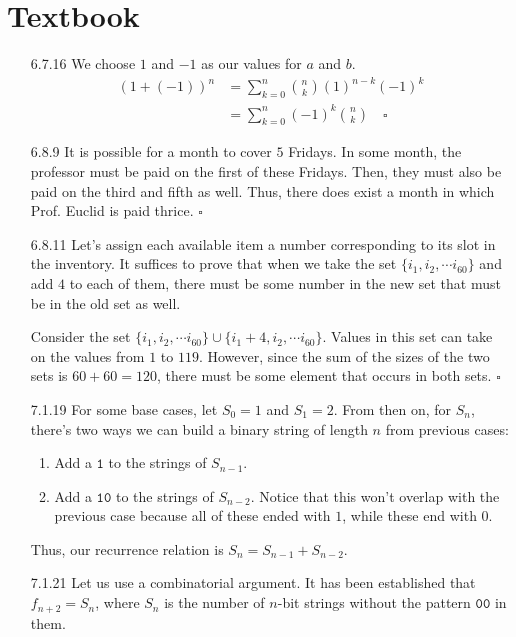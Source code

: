 \documentclass[12pt]{article}
\begin{document}
\section{Textbook}\label{sec:textbook}

\begin{enumerate}
    \item[6.7.16] We choose $1$ and $-1$ as our values for $a$ and $b$.
        \begin{align*}
            (1+(-1))^n & =\sum_{k=0}^{n} \binom{n}{k}(1)^{n-k}(-1)^k      \\
                       & = \sum_{k=0}^{n} (-1)^k \binom{n}{k}\quad\square
        \end{align*}
    \item[6.8.9] It is possible for a month to cover $5$ Fridays.
        In some month, the professor must be paid on the first of these Fridays.
        Then, they must also be paid on the third and fifth as well.
        Thus, there does exist a month in which Prof. Euclid is paid thrice. $\square$
    \item[6.8.11] Let's assign each available item a number corresponding to its slot in the inventory.
        It suffices to prove that when we take the set $\{i_1, i_2, \cdots i_{60}\}$ and add $4$ to each of them,
        there must be some number in the new set that must be in the old set as well.

        Consider the set $\{i_1, i_2, \cdots i_{60}\} \cup \{i_1+4, i_2, \cdots i_{60}\}$.
        Values in this set can take on the values from $1$ to $119$.
        However, since the sum of the sizes of the two sets is $60+60=120$,
        there must be some element that occurs in both sets. $\square$
    \item[7.1.19] \label{list:7.1.19} For some base cases, let $S_0=1$ and $S_1=2$.
        From then on, for $S_n$, there's two ways we can build a binary string of length $n$ from previous cases:
        \begin{enumerate}[label=\arabic*]
            \item Add a $\texttt{1}$ to the strings of $S_{n-1}$.
            \item Add a $\texttt{10}$ to the strings of $S_{n-2}$.
                  Notice that this won't overlap with the previous case because
                  all of these ended with $1$, while these end with $0$.
        \end{enumerate}
        Thus, our recurrence relation is $S_n=S_{n-1}+S_{n-2}$.
    \item[7.1.21] Let us use a combinatorial argument.
        It has been established that $f_{n+2}=S_n$,
        where $S_n$ is the number of $n$-bit strings without the pattern $\texttt{00}$ in them.


\end{enumerate}
\end{document}
